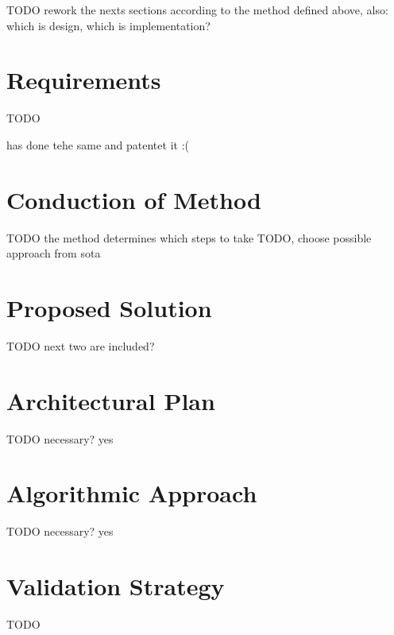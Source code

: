  
 TODO rework the nexts sections according to the method defined above, also: which is design, which is implementation?

\section{Requirements}
TODO

\autocite[][]{xang2016trafficlist} has done tehe same and patentet it :(

\section{Conduction of Method}
TODO the method determines which steps to take
TODO, choose possible approach from sota

\section{Proposed Solution}
TODO next two are included?

\section{Architectural Plan}
TODO necessary? yes

\section{Algorithmic Approach}
TODO necessary? yes

\section{Validation Strategy}

TODO